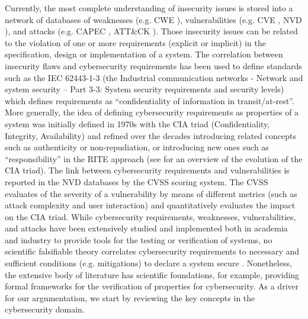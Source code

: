 \documentclass[conference]{IEEEtran}
\begin{document}
Currently, the most complete understanding of insecurity issues is stored into
a network of databases of weaknesses (e.g.
CWE \autocite{MITRE2020CWEresearch}), vulnerabilities (e.g. CVE \autocite{CVE},
NVD \autocite{NIST2020NVD}), and attacks (e.g. CAPEC \autocite{MITRE2020CAPEC},
ATT\&CK \autocite{MITRE2020ATTACK}).  Those insecurity issues can be related to
the violation of one or more requirements (explicit or implicit) in the
specification, design or implementation of a system. The correlation 
between insecurity flaws and cybersecurity requirements has been used to define
standards such as the IEC 62443-1-3 (the Industrial communication networks -
Network and system security -- Part 3-3: System security requirements and
security levels) which defines requirements as ``confidentiality of information
in transit/at-rest''. More generally, the idea of defining cybersecurity requirements
as properties of a system was initially defined in 1970s with the 
CIA triad (Confidentiality, Integrity, Availability) and refined 
over the decades introducing related concepts such as authenticity or
non-repudiation, or introducing new ones such as ``responsibility'' in the
RITE approach (see \autocite{Samonas2014cia} for an overview of the evolution of the CIA triad).
The link between cybersecurity requirements and vulnerabilities is reported 
in the NVD databases by the CVSS \autocite{Mell2007CVSS} scoring system.
The CVSS evaluates of the severity of a vulnerability
by means of different metrics (such as attack complexity and user interaction)
and quantitatively evaluates the impact on the CIA triad.
While cybersecurity requirements, weaknesses, vulnerabilities, and attacks
have been extensively studied and implemented both in academia and industry
to provide tools for the testing or verification of systems, 
no scientific falsifiable theory correlates
cybersecurity requirements to necessary and sufficient conditions (e.g. mitigations) 
to declare a system secure \autocite{Herley2016unfalsifiability}.
Nonetheless, the extensive body of literature has scientific foundations,
for example, providing formal frameworks for the verification of 
properties %
for cybersecurity.
As a driver for our argumentation, we start by reviewing the key concepts
in the cybersecurity domain.
\end{document}
